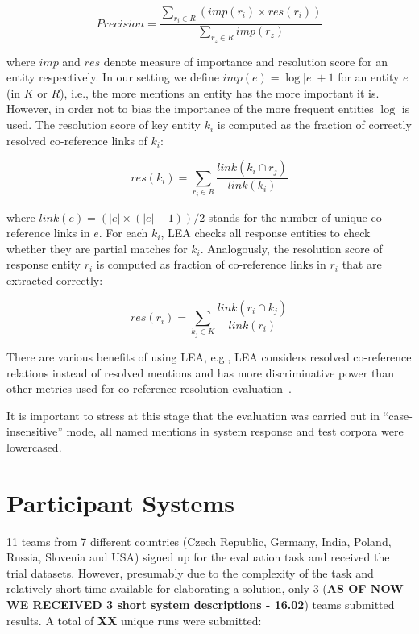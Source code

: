 \documentclass[11pt]{article}
\begin{document}
\begin{equation*}
	\mathit{Precision} = \frac{\sum_{r_{i} \in R} (\mathit{imp}(r_i) \times \mathit{res}(r_{i}))}
              {\sum_{r_{z} \in R} imp(r_{z})}
\end{equation*}

\noindent where $\mathit{imp}$ and $\mathit{res}$ denote measure of importance and resolution score for an entity respectively.
In our setting we define $\mathit{imp}(e) = \log|e|+1$ for an entity $e$ (in $K$ or $R$), i.e., the more mentions 
an entity has the more important it is. However, in order not to bias the importance of the more frequent entities $\log$ 
is used. The resolution score of key entity $k_i$ is computed as the fraction of correctly resolved co-reference 
links of $k_i$: 

\begin{equation*}
	\mathit{res}(k_i) = \sum_{r_{j} \in R} \frac{\mathit{link}(k_{i} \cap r_{j})}{\mathit{link}(k_{i})}
\end{equation*}

\noindent where $\mathit{link}(e) = (|e| \times (|e|-1))/2$ stands for the number of unique 
co-reference links in $e$. For each $k_i$, LEA checks all response entities to check whether 
they are partial matches for $k_i$. Analogously, the resolution score of response entity $r_i$ is
computed as fraction of co-reference links in $r_i$ that are extracted correctly:

\begin{equation*}
	\mathit{res}(r_i) = \sum_{k_{j} \in K} \frac{\mathit{link}(r_{i} \cap k_{j})}{\mathit{link}(r_{i})}
\end{equation*}

There are various benefits of using LEA, e.g., LEA considers resolved co-reference relations 
instead of resolved mentions and has more discriminative power than other metrics used
for co-reference resolution evaluation~\cite{DBLP:conf-acl-Moosavi016}.

It is important to stress at this stage that the evaluation was carried out in ``case-insensitive'' 
mode, all named mentions in system response and test corpora were lowercased.

\section{Participant Systems}
\label{sec:participants}
 
11 teams from 7 different countries (Czech Republic, Germany, India, Poland, Russia, Slovenia and USA) signed up for the evaluation task and received the trial datasets. However, presumably due to the complexity of the task and relatively short
time available for elaborating a solution, only 3 (\textbf{AS OF NOW WE RECEIVED 3 short system descriptions - 16.02}) teams submitted results. A total of \textbf{XX} unique runs were submitted: 
\end{document}
